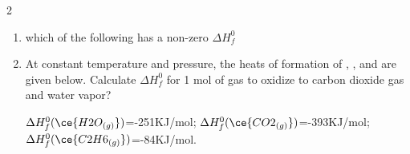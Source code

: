 \documentclass[main.tex]{subfiles}
\begin{document}
\begin{fullwidth}
\begin{multicols*}{2}
\begin{enumerate}
\item  which of the following has a non-zero $\Delta H^0_f$
\begin{enumerate}[label=(\alph*)]\vspace{-0.5cm}
\end{enumerate}\vspace{-0.5cm}





\item  At constant temperature and pressure, the heats of formation of ,  , and   are given below. Calculate $\Delta H^0_f$ for 1 mol of  gas to oxidize to carbon dioxide gas and water vapor?
 
\begin{center}\end{center}
$\Delta H^0_f(\ce{H2O_{(g)}})$=-251KJ/mol; $\Delta H^0_f(\ce{CO2_{(g)}})$=-393KJ/mol; $\Delta H^0_f(\ce{C2H6_{(g)}})$=-84KJ/mol.
\begin{enumerate}[label=(\alph*)]\vspace{-0.5cm}
\end{enumerate}\vspace{-0.5cm}

    \setcounter{enumTempB}{\theenumi}
\end{enumerate}
\end{multicols*}
\end{fullwidth}
\clearpage
\newpage
\thispagestyle{empty}
\end{document}
